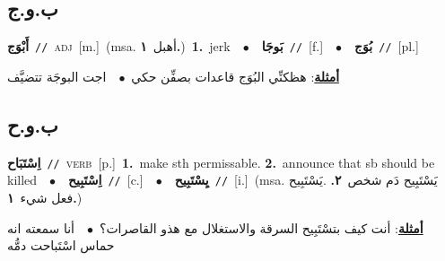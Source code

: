 \documentclass[10pt,a4paper,twoside]{article} %
\begin{document}
\begin{multicols}{2}
\vspace{-3mm}
\subsection*{\color{blue}\foreignlanguage{arabic}{ب.و.ج}\color{blue}{}} 

{\setlength\topsep{0pt}\textbf{\foreignlanguage{arabic}{أَبْوَج}}\ {\color{gray}\texttt{//}\color{black}}\ \textsc{adj}\ [m.]\ \color{gray}(msa. \foreignlanguage{arabic}{أهبل}~\foreignlanguage{arabic}{\textbf{١.}})\color{black}\ \textbf{1.}~jerk\ \ $\bullet$\ \ \setlength\topsep{0pt}\textbf{\foreignlanguage{arabic}{بَوجَا}}\ {\color{gray}\texttt{//}\color{black}}\ [f.]\ \ $\bullet$\ \ \setlength\topsep{0pt}\textbf{\foreignlanguage{arabic}{بُوَج}}\ {\color{gray}\texttt{//}\color{black}}\ [pl.]\  \begin{flushright}\color{gray}\foreignlanguage{arabic}{\textbf{\underline{\foreignlanguage{arabic}{أمثلة}}}: هظكنِّي البُوَج قاعدات بصفِّن حكي\ $\bullet$\ \  اجت البوجَة تتضيَّف}\end{flushright}\color{black}} \vspace{2mm}

\vspace{-3mm}
\subsection*{\color{blue}\foreignlanguage{arabic}{ب.و.ح}\color{blue}{}} 

{\setlength\topsep{0pt}\textbf{\foreignlanguage{arabic}{اِسْتَبَاح}}\ {\color{gray}\texttt{//}\color{black}}\ \textsc{verb}\ [p.]\ \textbf{1.}~make sth permissable.  \textbf{2.}~announce that sb should be killed\ \ $\bullet$\ \ \setlength\topsep{0pt}\textbf{\foreignlanguage{arabic}{اِسْتَبِيح}}\ {\color{gray}\texttt{//}\color{black}}\ [c.]\ \ $\bullet$\ \ \setlength\topsep{0pt}\textbf{\foreignlanguage{arabic}{يِسْتَبِيح}}\ {\color{gray}\texttt{//}\color{black}}\ [i.]\ \color{gray}(msa. \foreignlanguage{arabic}{يَسْتَبِيح دَم شخص}~\foreignlanguage{arabic}{\textbf{٢.}}  .\foreignlanguage{arabic}{يَسْتَبِيح فعل شيء}~\foreignlanguage{arabic}{\textbf{١.}})\color{black}\  \begin{flushright}\color{gray}\foreignlanguage{arabic}{\textbf{\underline{\foreignlanguage{arabic}{أمثلة}}}: أنت كيف بتسْتَبِيح السرقة والاستغلال مع هذو القاصرات؟\ $\bullet$\ \  أنا سمعته انه حماس اسْتَباحت دمُّه}\end{flushright}\color{black}} \vspace{2mm}


\end{multicols}
\end{document}
